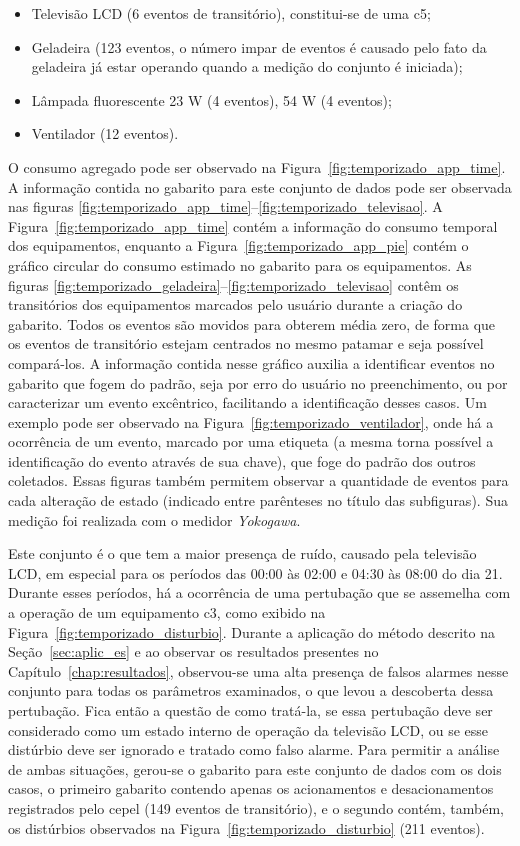 \begin{itemize}
\item Televisão LCD (6 eventos de transitório), constitui-se de uma \acs{c5};
\item Geladeira (123 eventos, o número impar de eventos é causado pelo
fato da geladeira já estar operando quando a medição do conjunto é
iniciada);
\item Lâmpada fluorescente 23 W (4 eventos), 54 W (4 eventos);
\item Ventilador (12 eventos).
\end{itemize}

O consumo agregado pode ser observado na
Figura~\ref{fig:temporizado_app_time}. A informação contida no
gabarito para este conjunto de dados pode ser observada nas figuras
\ref{fig:temporizado_app_time}--\ref{fig:temporizado_televisao}.
A Figura~\ref{fig:temporizado_app_time} contém a informação do consumo
temporal dos equipamentos, enquanto a
Figura~\ref{fig:temporizado_app_pie} contém o gráfico circular do
consumo estimado no gabarito para os equipamentos. As figuras
\ref{fig:temporizado_geladeira}--\ref{fig:temporizado_televisao}
contêm os transitórios dos equipamentos marcados pelo usuário durante
a criação do gabarito. Todos os eventos são movidos para obterem média
zero, de forma que os eventos de transitório estejam centrados no mesmo
patamar e seja possível compará-los. A informação contida nesse
gráfico auxilia a identificar eventos no gabarito que fogem do padrão,
seja por erro do usuário no preenchimento, ou por caracterizar um
evento excêntrico, facilitando a identificação desses casos. Um
exemplo pode ser observado na Figura~\ref{fig:temporizado_ventilador},
onde há a ocorrência de um evento, marcado por uma etiqueta (a mesma
torna possível a identificação do evento através de sua chave), que
foge do padrão dos outros coletados. Essas figuras também permitem
observar a quantidade de eventos para cada alteração de estado
(indicado entre parênteses no título das subfiguras). Sua medição foi
realizada com o medidor \emph{Yokogawa}.

Este conjunto é o que tem a maior presença de ruído, causado pela
televisão LCD, em especial para os períodos das 00:00 às 02:00 e 04:30
às 08:00 do dia 21. Durante esses períodos, há a ocorrência de uma
pertubação que se assemelha com a operação de um equipamento \acs{c3},
como exibido na Figura~\ref{fig:temporizado_disturbio}. Durante a
aplicação do método descrito na Seção~\ref{sec:aplic_es} e ao
observar os resultados presentes no Capítulo~\ref{chap:resultados},
observou-se uma alta presença de falsos alarmes nesse conjunto para
todas os parâmetros examinados, o que levou a descoberta dessa
pertubação. Fica então a questão de como tratá-la, se essa pertubação
deve ser considerado como um estado interno de operação da televisão
LCD, ou se esse distúrbio deve ser ignorado e tratado como falso
alarme. Para permitir a análise de ambas situações, gerou-se o
gabarito para este conjunto de dados com os dois casos, o primeiro
gabarito contendo apenas os acionamentos e desacionamentos registrados
pelo \acs{cepel} (149 eventos de transitório), e o segundo contém,
também, os distúrbios observados na
Figura~\ref{fig:temporizado_disturbio} (211 eventos).

